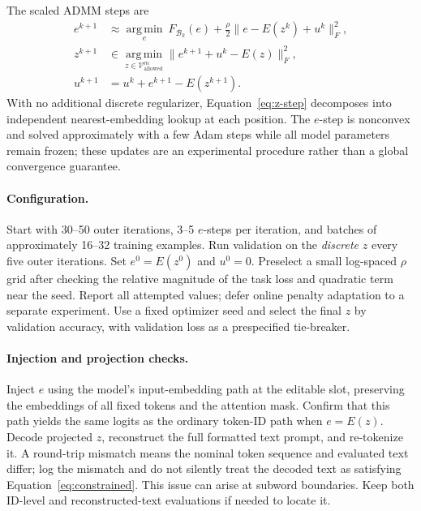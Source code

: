 \documentclass[11pt]{article}
\newcommand{\V}{\mathcal V}
\newcommand{\argmin}{\operatorname*{arg\,min}}
\begin{document}
The scaled ADMM steps are
\begin{align}
e^{k+1}&\approx\argmin_e\ F_{\mathcal B_k}(e)
  +\frac{\rho}{2}\|e-E(z^k)+u^k\|_F^2,\label{eq:e-step}\\
z^{k+1}&\in\argmin_{z\in\V_{\mathrm{allowed}}^m}
  \|e^{k+1}+u^k-E(z)\|_F^2,\label{eq:z-step}\\
u^{k+1}&=u^k+e^{k+1}-E(z^{k+1}).\label{eq:u-step}
\end{align}
With no additional discrete regularizer, Equation~\eqref{eq:z-step} decomposes into independent nearest-embedding lookup at each position. The $e$-step is nonconvex and solved approximately with a few Adam steps while all model parameters remain frozen; these updates are an experimental procedure rather than a global convergence guarantee.

\paragraph{Configuration.} Start with 30--50 outer iterations, 3--5 $e$-steps per iteration, and batches of approximately 16--32 training examples. Run validation on the \emph{discrete} $z$ every five outer iterations. Set $e^0=E(z^0)$ and $u^0=0$. Preselect a small log-spaced $\rho$ grid after checking the relative magnitude of the task loss and quadratic term near the seed. Report all attempted values; defer online penalty adaptation to a separate experiment. Use a fixed optimizer seed and select the final $z$ by validation accuracy, with validation loss as a prespecified tie-breaker.

\paragraph{Injection and projection checks.} Inject $e$ using the model's input-embedding path at the editable slot, preserving the embeddings of all fixed tokens and the attention mask. Confirm that this path yields the same logits as the ordinary token-ID path when $e=E(z)$. Decode projected $z$, reconstruct the full formatted text prompt, and re-tokenize it. A round-trip mismatch means the nominal token sequence and evaluated text differ; log the mismatch and do not silently treat the decoded text as satisfying Equation~\eqref{eq:constrained}. This issue can arise at subword boundaries. Keep both ID-level and reconstructed-text evaluations if needed to locate it.
\end{document}
